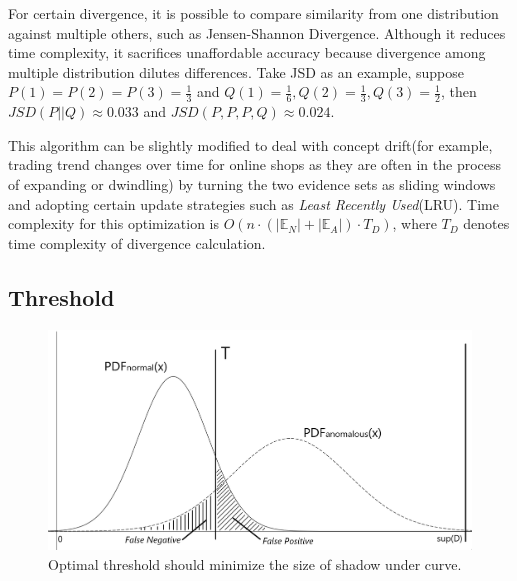 \documentclass{article}
\begin{document}
			For certain divergence, it is possible to compare similarity from one distribution against multiple others, such as Jensen-Shannon Divergence. Although it reduces time complexity, it sacrifices unaffordable accuracy because divergence among multiple distribution dilutes differences. Take JSD as an example, suppose $P(1) = P(2) = P(3) = \frac{1}{3}$ and $Q(1) = \frac{1}{6}, Q(2) = \frac{1}{3}, Q(3) = \frac{1}{2}$, then $JSD(P||Q) \approx 0.033$ and $JSD(P, P, P, Q) \approx 0.024$.
			
			This algorithm can be slightly modified to deal with concept drift(for example, trading trend changes over time for online shops as they are often in the process of expanding or dwindling) by turning the two evidence sets as sliding windows and adopting certain update strategies such as \textit{Least Recently Used}(LRU). Time complexity for this optimization is $O(n\cdot(|\mathbb{E}_N|+|\mathbb{E}_A|)\cdot T_D)$, where $T_D$ denotes time complexity of divergence calculation.
	
		\subsection{Threshold}\label{sec:alg-threshold}
			\begin{figure}[t]
				\centering
				\includegraphics[width=\linewidth]{fig/ExampleThreshold.png}
				\caption{Optimal threshold should minimize the size of shadow under curve.}
				\label{fig:example-threshold}
			\end{figure}
			
\end{document}
